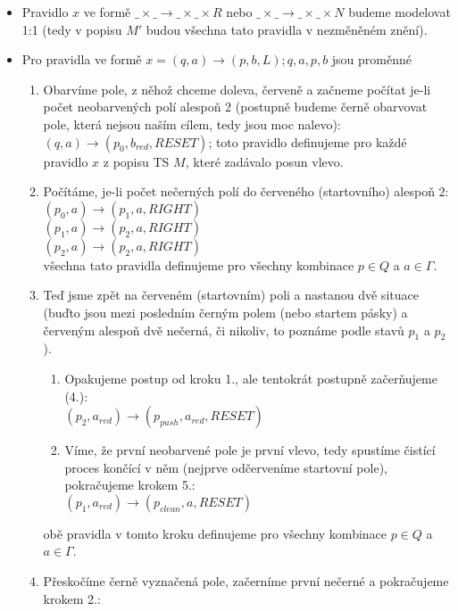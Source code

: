 \documentclass[a4paper,12pt]{article} %
\begin{document}
\begin{itemize}
    \item Pravidlo $x$ ve formě $\_ \times \_ \to \_ \times \_ \times R$ nebo $\_ \times \_ \to \_ \times \_ \times N$ budeme modelovat 1:1 (tedy v popisu $M'$ budou všechna tato pravidla v nezměněném znění).
    \item Pro pravidla ve formě $x = (q, a) \to (p, b, L); q,a,p,b$ jsou proměnné
    \begin{enumerate}
        \item Obarvíme pole, z něhož chceme doleva, červeně a začneme počítat je-li počet neobarvených polí alespoň 2 (postupně budeme černě obarvovat pole, která nejsou naším cílem, tedy jsou moc nalevo): \\
        $(q, a) \to (p_{0}, b_{red}, RESET)$; toto pravidlo definujeme pro každé pravidlo $x$ z popisu TS $M$, které zadávalo posun vlevo.
        \item Počítáme, je-li počet nečerných polí do červeného (startovního) alespoň 2:\\
        $(p_{0}, a) \to (p_{1}, a, RIGHT)$\\
        $(p_{1}, a) \to (p_{2}, a, RIGHT)$\\
        $(p_{2}, a) \to (p_{2}, a, RIGHT)$\\
        všechna tato pravidla definujeme pro všechny kombinace $p \in Q$ a $a \in \Gamma$.
        \item Teď jsme zpět na červeném (startovním) poli a nastanou dvě situace (buďto jsou mezi posledním černým polem (nebo startem pásky) a červeným alespoň dvě nečerná, či nikoliv, to poznáme podle stavů $p_1$ a $p_2$).
        \begin{enumerate}
            \item Opakujeme postup od kroku 1., ale tentokrát postupně začerňujeme (4.):\\
            $(p_{2}, a_{red}) \to (p_{push}, a_{red}, RESET)$
            \item Víme, že první neobarvené pole je první vlevo, tedy spustíme čistící proces končící v něm (nejprve odčerveníme startovní pole), pokračujeme krokem 5.:\\
            $(p_{1}, a_{red}) \to (p_{clean}, a, RESET)$
        \end{enumerate}
        obě pravidla v tomto kroku definujeme pro všechny kombinace $p \in Q$ a $a \in \Gamma$.
        \item Přeskočíme černě vyznačená pole, začerníme první nečerné a pokračujeme krokem 2.:\\

\end{enumerate}
\end{itemize}
\end{document}
